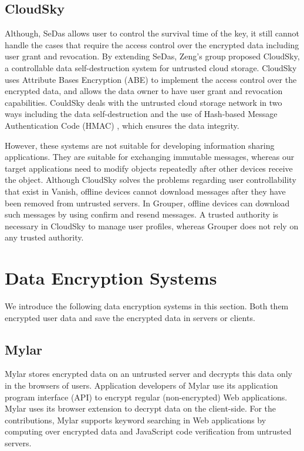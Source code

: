 \documentclass[a4paper,11pt]{report}
\begin{document}
\subsection{CloudSky}

Although, SeDas allows user to control the survival time of the key, it still cannot handle the cases that require the access control over the encrypted data including user grant and revocation.
By extending SeDas, Zeng's group proposed CloudSky\cite{zeng2015cloudsky}, a controllable data self-destruction system for untrusted cloud storage. 
CloudSky uses Attribute Bases Encryption (ABE) to implement the access control over the encrypted data, and allows the data owner to have user grant and revocation capabilities.
CouldSky deals with the untrusted cloud storage network in two ways including the data self-destruction and the use of Hash-based Message Authentication Code (HMAC) \cite{bellare1997hmac}, which ensures the data integrity.

However, these systems are not suitable for developing information sharing applications. 
They are suitable for exchanging immutable messages, whereas our target applications need to modify objects repeatedly after other devices receive the object. 
Although CloudSky solves the problems regarding user controllability that exist in Vanish, offline devices cannot download messages after they have been removed from untrusted servers.
In Grouper, offline devices can download such messages by using confirm and resend messages.
A trusted authority is necessary in CloudSky to manage user profiles, whereas Grouper does not rely on any trusted authority.

\section{Data Encryption Systems}

We introduce the following data encryption systems in this section.
Both them encrypted user data and save the encrypted data in servers or clients.

\subsection{Mylar}
Mylar\cite{popa2014building} stores encrypted data on an untrusted server and decrypts this data only in the browsers of users. 
Application developers of Mylar use its application program interface (API) to encrypt regular (non-encrypted) Web applications. 
Mylar uses its browser extension to decrypt data on the client-side. 
For the contributions, Mylar supports keyword searching in Web applications by computing over encrypted data and JavaScript code verification from untrusted servers.
\end{document}
